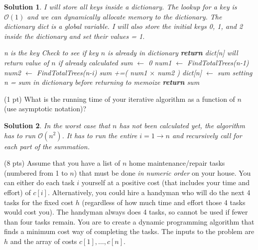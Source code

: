 \documentclass[11pt]{article}
\newtheorem*{solution}{Solution}
\begin{document}
\begin{enumerate}
\begin{enumerate}
\begin{solution}
    \item I will store all keys inside a dictionary. The lookup for a key is $\mathcal{O}(1)$ and we can dynamically allocate memory to the dictionary. The dictionary \textnormal{dict} is a global variable.
          I will also store the initial keys 0, 1, and 2 inside the dictionary and set their values = 1. 
    \begin{algorithmic}
         \Comment n is the key 
             \Comment Check to see if key $n$ is already in dictionary
                \State \textbf{return} dict[n] \Comment will return value of $n$ if already calculated
            \EndIf
            \State sum $\leftarrow$ 0
                \State num1 $\leftarrow$ FindTotalTrees(n-1)
                \State num2 $\leftarrow$ FindTotalTrees(n-i)
                \State sum +=( num1 $\times$ num2 )
            \EndFor
            \State dict[n] $\leftarrow$ sum \Comment setting n = sum in dictionary before returning to memoize
            \State \textbf{return} sum
        \EndProcedure
    \end{algorithmic}
\end{solution}
\newpage


\item (1 pt) What is the running time of your iterative algorithm as a function of $n$ (use asymptotic notation)?
\end{enumerate}
\begin{solution}
    \item In the worst case that $n$ has not been calculated yet, the algorithm has to run $\mathcal{O}(n^2)$. It has to run the entire $i=1 \rightarrow n$ and recursively call for each part of the 
          summation. 
\end{solution}
\newpage
\item (8  pts) Assume that you have a list of $n$ home maintenance/repair tasks (numbered from 1 to $n$) that must be done \emph{in numeric order} on your house.  
 You can either do each task $i$ yourself at a positive cost (that includes your time and effort) of $c[i]$.  
 Alternatively, you could hire a handyman who will do the next 4 tasks for the fixed cost $h$ (regardless of how much time and effort those 4 tasks would  cost you).  
 The handyman always does 4 tasks, so cannot be used if fewer than four tasks remain.
You are to create a dynamic programming algorithm that finds a minimum cost way of completing the tasks.
The inputs to the problem are $h$ and the array of costs $c[1], \ldots, c[n]$.


\end{enumerate}
\end{document}
